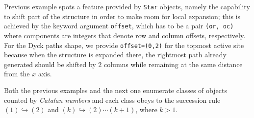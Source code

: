 Previous example spots a feature provided by \verb|Star| objects,
namely the capability to shift part of the structure in order to make
room for local expansion; this is achieved by the keyword argument
\verb|offset|, which has to be a pair \verb|(or, oc)| where components
are integers that denote row and column offsets, respectively.
For the Dyck paths shape, we provide \verb|offset=(0,2)| for the topmost
active site because when the structure is expanded there, the rightmost
path already generated should be shifted by $2$ columns while remaining
at the same distance from the $x$ axis.



Both the previous examples and the next one enumerate classes of objects
counted by \textit{Catalan numbers} and each class obeys to the succession rule
$(1) \hookrightarrow (2)$ and $(k) \hookrightarrow (2)\cdots(k+1)$, where
$k>1$.

